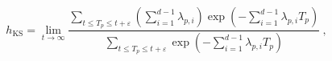 \begin{equation}
h_\mathrm{KS} = \lim_{t\rightarrow\infty}
\frac{\sum_{t\leq T_p\leq t+\varepsilon} \left( \sum_{i=1}^{d-1}
\lambda_{p,i}\right) \exp\left( -\sum_{i=1}^{d-1}\lambda_{p,i}
T_p\right)} {\sum_{t\leq T_p\leq t+\varepsilon}
\exp\left( -\sum_{i=1}^{d-1}\lambda_{p,i}T_p\right)} \ ,
\label{eq26}
\end{equation}

